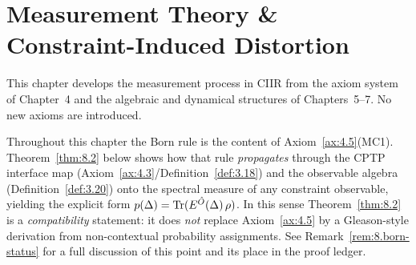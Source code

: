 %
%
%
%

%
%

\section{Measurement Theory \& Constraint-Induced Distortion}
\label{sec:ch8:measurement}

This chapter develops the measurement process in CIIR from the axiom
system of Chapter~4 and the algebraic and dynamical structures of
Chapters~5--7.  No new axioms are introduced.

Throughout this chapter the Born rule is the content of
Axiom~\ref{ax:4.5}(MC1).  Theorem~\ref{thm:8.2} below shows how that
rule \emph{propagates} through the CPTP interface map
(Axiom~\ref{ax:4.3}/Definition~\ref{def:3.18}) and the observable
algebra (Definition~\ref{def:3.20}) onto the spectral measure of any
constraint observable, yielding the explicit form
$p(\Delta) = \mathrm{Tr}(E^{\hat{O}}(\Delta)\,\rho)$.  In this sense
Theorem~\ref{thm:8.2} is a \emph{compatibility} statement: it does
\emph{not} replace Axiom~\ref{ax:4.5} by a Gleason-style derivation
from non-contextual probability assignments.  See
Remark~\ref{rem:8.born-status} for a full discussion of this point and
its place in the proof ledger.

